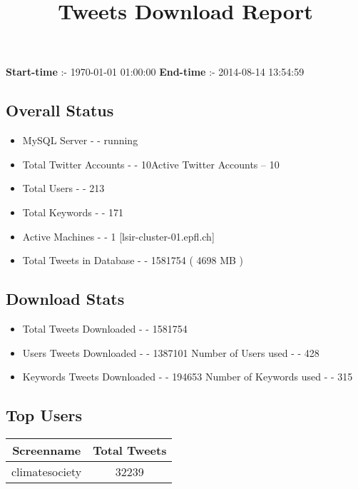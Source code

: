 \documentclass{article}\usepackage[T1]{fontenc}
\begin{document}
\title{\textbf{Tweets Download Report}}
               \date{}
                \maketitle
               \centerline{\textbf{Start-time} :- 1970-01-01 01:00:00 \hspace{40pt} \textbf{End-time} :- 2014-08-14 13:54:59}               \subsection*{Overall Status}                \begin{itemize}                \item MySQL Server - - running               \item Total Twitter Accounts - - 10\newline Active Twitter Accounts -- 10               \item Total Users - - 213               \item Total Keywords - - 171               \item Active Machines - - 1 [lsir-cluster-01.epfl.ch]               \item Total Tweets in Database - - 1581754 ( 4698 MB )               \end{itemize}               \subsection*{Download Stats}                \begin{itemize}                \item Total Tweets Downloaded - - 1581754               \item Users Tweets Downloaded - - 1387101 \newline Number of Users used - - 428               \item Keywords Tweets Downloaded - - 194653 \newline Number of Keywords used - - 315              \end{itemize}              \subsection*{Top Users}\begin{tabular}{|c|c|}         \hline         Screenname & Total Tweets \\ 
 \hline
climatesociety & 32239\\ 

\end{tabular}
\end{document}
